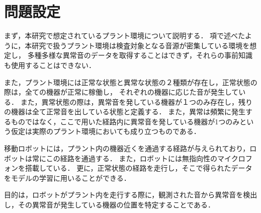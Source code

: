 \documentclass[../main]{subfiles}
\begin{document}
\section{問題設定}
\label{sec:pmethod_introduction}
まず，本研究で想定されているプラント環境について説明する．
項で述べたように，本研究で扱うプラント環境は検査対象となる音源が密集している環境を想定し，
多種多様な異常音のデータを取得することはできず，それらの事前知識も使用することはできない．

また，プラント環境には正常な状態と異常な状態の２種類が存在し，正常状態の際は，全ての機器が正常に稼働し，
それぞれの機器に応じた音が発生している．
また，異常状態の際は，異常音を発している機器が１つのみ存在し，残りの機器は全て正常音を出している状態と定義する．
また，異常は頻繁に発生するものではなく，ここで用いた経路内に異常音を発している機器が1つのみという仮定は実際のプラント環境においても成り立つものである．

移動ロボットには，プラント内の機器近くを通過する経路が与えられており，ロボットは常にこの経路を通過する．
また，ロボットには無指向性のマイクロフォンを搭載している．
更に，正常状態の経路を走行し，そこで得られたデータをモデルの学習に用いることができる．

目的は，ロボットがプラント内を走行する際に，観測された音から異常音を検出し，その異常音が発生している機器の位置を特定することである．
\end{document}

